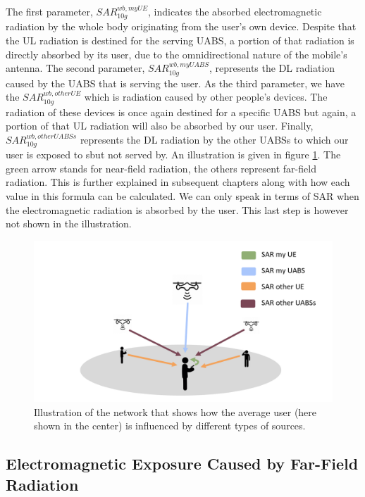 The first parameter, $SAR^{wb,myUE}_{10g}$, indicates the absorbed electromagnetic radiation by the whole body originating from the user's own device. Despite that the 
\gls{UL} radiation is destined for the serving \gls{UABS}, a portion of that radiation is directly absorbed by its user, due to the omnidirectional nature of the mobile's antenna.
The second parameter, $SAR^{wb,myUABS}_{10g}$, represents the \gls{DL} radiation caused by the \gls{UABS} that is serving the user.
As the third parameter, we have the $SAR^{wb,otherUE}_{10g}$ which is radiation caused by other people's devices. The radiation of these devices is once again 
destined for a specific \gls{UABS} but again, a portion of that \gls{UL} radiation will also be absorbed by our user.
Finally, $SAR^{wb,otherUABSs}_{10g}$ represents the \gls{DL} radiation by the other \gls{UABS}s to which our user is exposed to sbut not served by.
An illustration is given in figure \ref{fig:networkIllustration}.
The green arrow stands for near-field radiation, the others represent far-field radiation.
This is further 
explained in subsequent chapters along with how each value in this formula can be calculated. We can only speak in terms of \gls{SAR}
  when the electromagnetic radiation is absorbed by the user. This last step is however not shown in the illustration.

\begin{figure}[h!]
\centering
  \includegraphics[width=\textwidth/3*2]{../images/networkIllustrationSARSources.png}
  \caption{Illustration of the network that shows how the average user (here shown in the center) is influenced by different types of sources. }
  \label{fig:networkIllustration}
\end{figure}

\subsection{Electromagnetic Exposure Caused by Far-Field Radiation} %
\label{sub:Calculatingdownlinkexpsure}

